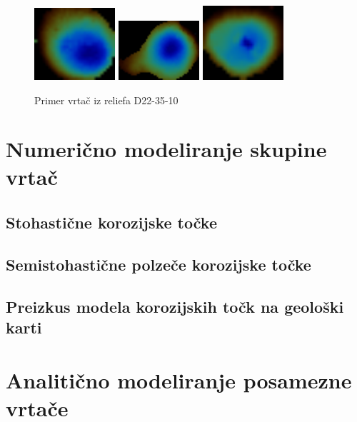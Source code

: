 \documentclass[a4paper, 12pt]{book}
\begin{document}
\begin{figure}
\begin{center}
\includegraphics[width=3cm]{slike/D22-35-10-fig11}
\includegraphics[width=3cm]{slike/D22-35-10-fig14}
\includegraphics[width=3cm]{slike/D22-35-10-fig32}
\end{center}
\caption{Primer vrtač iz reliefa D22-35-10}
\label{pic3}
\end{figure}

\chapter{Numerično modeliranje skupine vrtač}
\label{ch2}

\section{Stohastične korozijske točke}
\section{Semistohastične polzeče korozijske točke}
\section{Preizkus modela korozijskih točk na geološki karti}



\chapter{Analitično modeliranje posamezne vrtače}
\label{ch3}
\end{document}
